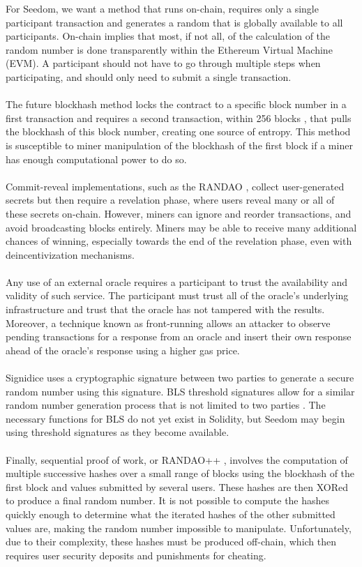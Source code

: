 \documentclass[11pt]{article}
\begin{document}
For Seedom, we want a method that runs on-chain, requires only a single participant transaction and generates a random that is globally available to all participants. On-chain implies that most, if not all, of the calculation of the random number is done transparently within the Ethereum Virtual Machine (EVM). A participant should not have to go through multiple steps when participating, and should only need to submit a single transaction.\\\\
The future blockhash method locks the contract to a specific block number in a first transaction and requires a second transaction, within 256 blocks \cite{14}, that pulls the blockhash of this block number, creating one source of entropy. This method is susceptible to miner manipulation of the blockhash of the first block if a miner has enough computational power to do so.\\\\
Commit-reveal implementations, such as the RANDAO \cite{2}, collect user-generated secrets but then require a revelation phase, where users reveal many or all of these secrets on-chain. However, miners can ignore and reorder transactions, and avoid broadcasting blocks entirely. Miners may be able to receive many additional chances of winning, especially towards the end of the revelation phase, even with deincentivization mechanisms.\\\\
Any use of an external oracle requires a participant to trust the availability and validity of such service. The participant must trust all of the oracle's underlying infrastructure and trust that the oracle has not tampered with the results. Moreover, a technique known as front-running allows an attacker to observe pending transactions for a response from an oracle and insert their own response ahead of the oracle's response using a higher gas price.\\\\
Signidice uses a cryptographic signature between two parties to generate a secure random number using this signature. BLS threshold signatures allow for a similar random number generation process that is not limited to two parties \cite{15}. The necessary functions for BLS do not yet exist in Solidity, but Seedom may begin using threshold signatures as they become available.\\\\
Finally, sequential proof of work, or RANDAO++ \cite{13}, involves the computation of multiple successive hashes over a small range of blocks using the blockhash of the first block and values submitted by several users. These hashes are then XORed to produce a final random number. It is not possible to compute the hashes quickly enough to determine what the iterated hashes of the other submitted values are, making the random number impossible to manipulate. Unfortunately, due to their complexity, these hashes must be produced off-chain, which then requires user security deposits and punishments for cheating.\\\\
\end{document}
